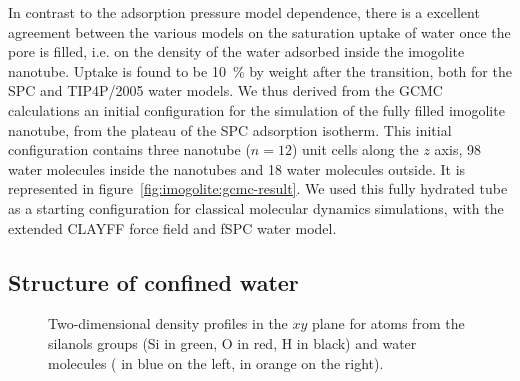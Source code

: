 \documentclass[thesis]{subfiles}
\begin{document}
In contrast to the adsorption pressure model dependence, there is a excellent
agreement between the various models on the saturation uptake of water once the
pore is filled, i.e. on the density of the water adsorbed inside the imogolite
nanotube. Uptake is found to be 10~\% by weight after the transition, both for
the SPC and TIP4P/2005 water models. We thus derived from the GCMC calculations
an initial configuration for the simulation of the fully filled imogolite
nanotube, from the plateau of the SPC adsorption isotherm. This initial
configuration contains three nanotube ($n=12$) unit cells along the $z$ axis, 98
water molecules inside the nanotubes and 18 water molecules outside. It is
represented in figure~\ref{fig:imogolite:gcmc-result}. We used this fully
hydrated tube as a starting configuration for classical molecular dynamics
simulations, with the extended CLAYFF force field and fSPC water model.

\subsection{Structure of confined water}

\begin{figure}[t]
    \centering
    
    \caption{Two-dimensional density profiles in the $xy$ plane for atoms from
    the silanols groups (Si in green, O in red, H in black) and water molecules
    ( in blue on the left,  in orange on the right).}
    \label{fig:imogolite:density:xy}
\end{figure}
\end{document}

